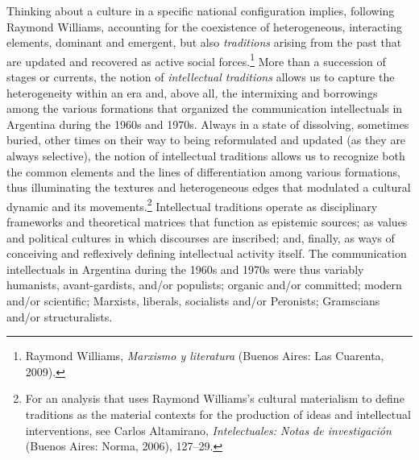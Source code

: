 \documentclass{tufte-handout}
\begin{document}
Thinking about a culture in a specific national configuration implies,
following Raymond Williams, accounting for the coexistence of
heterogeneous, interacting elements, dominant and emergent, but also
\emph{traditions} arising from the past that are updated and recovered
as active social forces.\footnote{Raymond Williams, \emph{Marxismo y
  literatura} (Buenos Aires: Las Cuarenta, 2009).} More than a
succession of stages or currents, the notion of \emph{intellectual
traditions} allows us to capture the heterogeneity within an era and,
above all\emph{,} the intermixing and borrowings among the various
formations that organized the communication intellectuals in Argentina
during the 1960s and 1970s. Always in a state of dissolving, sometimes
buried, other times on their way to being reformulated and updated (as
they are always selective), the notion of intellectual traditions allows
us to recognize both the common elements and the lines of
differentiation among various formations, thus illuminating the textures
and heterogeneous edges that modulated a cultural dynamic and its
movements.\footnote{For an analysis that uses Raymond Williams's
  cultural materialism to define traditions as the material contexts for
  the production of ideas and intellectual interventions, see Carlos
  Altamirano, \emph{Intelectuales: Notas de investigación} (Buenos
  Aires: Norma, 2006), 127--29.} Intellectual traditions operate as
disciplinary frameworks and theoretical matrices that function as
epistemic sources; as values and political cultures in which discourses
are inscribed; and, finally, as ways of conceiving and reflexively
defining intellectual activity itself. The communication intellectuals
in Argentina during the 1960s and 1970s were thus variably humanists,
avant-gardists, and/or populists; organic and/or committed; modern
and/or scientific; Marxists, liberals, socialists and/or Peronists;
Gramscians and/or structuralists.
\end{document}
